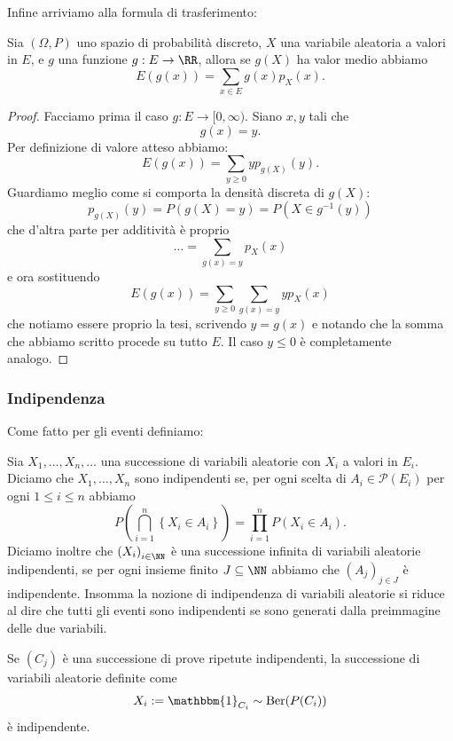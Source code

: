 \documentclass[11pt]{scrartcl}
\newcommand{\parti}[1]{\mathcal{P}\!\left(#1\right)}
\begin{document}
	Infine arriviamo alla formula di trasferimento:
	\begin{proposition}
		Sia $(\Omega,P)$ uno spazio di probabilità discreto, $X$ una variabile aleatoria a valori in $E$, e $g$ una funzione $g:E\to \RR$, allora se $g(X)$ ha valor medio abbiamo 
		$$E(g(x))=\sum_{x\in E}g(x)p_X(x).$$
	\end{proposition}
	\begin{proof}
		Facciamo prima il caso $g:E\to[0,\infty)$. Siano $x,y$ tali che
		$$g(x)=y.$$
		Per definizione di valore atteso abbiamo:
		$$E(g(x))=\sum_{y\ge 0}yp_{g(X)}(y).$$
		Guardiamo meglio come si comporta la densità discreta di $g(X)$: 
		$$p_{g(X)}(y)=P(g(X)=y)=P(X\in g^{-1}(y))$$
		che d'altra parte per additività è proprio
		$$\dots=\sum_{g(x)=y}p_X(x)$$
		e ora sostituendo 
		$$E(g(x))=\sum_{y\ge 0}\sum_{g(x)=y}yp_X(x)$$
		che notiamo essere proprio la tesi, scrivendo $y=g(x)$ e notando che la somma che abbiamo scritto procede su tutto $E$. Il caso $y\le 0$ è completamente analogo.
	\end{proof}
	
	\subsubsection{Indipendenza}
	
	Come fatto per gli eventi definiamo:
	\begin{definition}
		Sia $X_1,\dots,X_n,\dots$ una successione di variabili aleatorie con $X_i$ a valori in $E_i$. Diciamo che $X_1,\dots,X_n$ sono indipendenti se, per ogni scelta di $A_i\in \parti{E_i}$ per ogni $1\le i\le n$ abbiamo
		$$P\left(\bigcap_{i=1}^n \left\{X_i\in A_i\right\}\right)=\prod_{i=1}^n P(X_i\in A_i).$$ 
		Diciamo inoltre che $\left(X_i\right)_{i\in \NN}$ è una successione infinita di variabili aleatorie indipendenti, se per ogni insieme finito $J\subseteq \NN$ abbiamo che $\left(A_j\right)_{j\in J}$ è indipendente. Insomma la nozione di indipendenza di variabili aleatorie si riduce al dire che tutti gli eventi sono indipendenti se sono generati dalla preimmagine delle due variabili.
	\end{definition}
	\begin{example}
		Se $\left(C_j\right)$ è una successione di prove ripetute indipendenti, la successione di variabili aleatorie definite come
		$$X_i:=\mathbbm{1}_{C_i}\sim \text{Ber}(P(C_i))$$
		è indipendente.
	\end{example}
	
\end{document}
